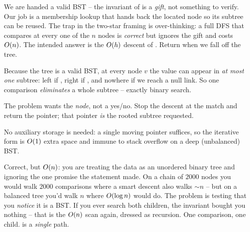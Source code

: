 We are handed a valid BST -- the invariant of  is a \emph{gift}, not something to
verify. Our job is a membership lookup that hands back the located node so its subtree can be reused.
The trap in the two-star framing is over-thinking: a full DFS that compares  at every one
of the $n$ nodes is \emph{correct} but ignores the gift and costs $O(n)$. The intended answer is
the $O(h)$ descent of . Return  when we fall off the tree.

\begin{observation}
Because the tree is a valid BST, at every node $v$ the value  can appear in \emph{at most
one} subtree: left if , right if , and nowhere if we reach a
null link. So one comparison \emph{eliminates} a whole subtree -- exactly binary search.
\end{observation}
\begin{observation}
The problem wants the \emph{node}, not a yes/no. Stop the descent at the match and return the
pointer; that pointer \emph{is} the rooted subtree requested.
\end{observation}
\begin{observation}
No auxiliary storage is needed: a single moving pointer suffices, so the iterative form is
$O(1)$ extra space and immune to stack overflow on a deep (unbalanced) BST.
\end{observation}

\begin{thinkbox}
{Correct, but $O(n)$: you are treating the data as an unordered binary tree and ignoring the one
promise the statement made. On a chain of $2000$ nodes you would walk $2000$ comparisons where a
smart descent also walks $\sim n$ -- but on a balanced tree you'd walk $n$ where $O(\log n)$
would do. The problem is testing that you \emph{notice} it is a BST.}
{If you ever search both children, the invariant bought you nothing -- that is the $O(n)$ scan
again, dressed as recursion. One comparison, one child.  is a \emph{single}
path.}
\end{thinkbox}

